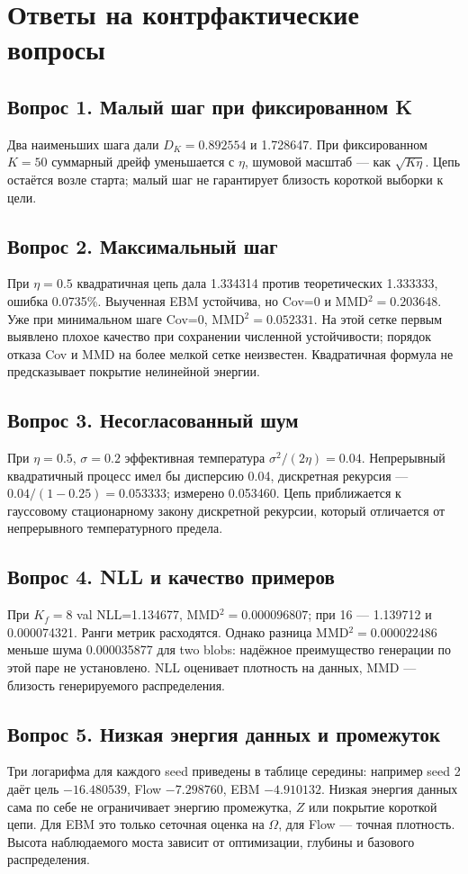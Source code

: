 \section{Ответы на контрфактические вопросы}
\subsection*{Вопрос 1. Малый шаг при фиксированном K}
Два наименьших шага дали $D_K=0.892554$ и 1.728647. При фиксированном $K=50$ суммарный дрейф уменьшается с $\eta$, шумовой масштаб --- как $\sqrt{K\eta}$. Цепь остаётся возле старта; малый шаг не гарантирует близость короткой выборки к цели.
\subsection*{Вопрос 2. Максимальный шаг}
При $\eta=0.5$ квадратичная цепь дала 1.334314 против теоретических 1.333333, ошибка 0.0735\%. Выученная EBM устойчива, но Cov=0 и MMD$^2=0.203648$. Уже при минимальном шаге Cov=0, MMD$^2=0.052331$. На этой сетке первым выявлено плохое качество при сохранении численной устойчивости; порядок отказа Cov и MMD на более мелкой сетке неизвестен. Квадратичная формула не предсказывает покрытие нелинейной энергии.
\subsection*{Вопрос 3. Несогласованный шум}
При $\eta=0.5$, $\sigma=0.2$ эффективная температура $\sigma^2/(2\eta)=0.04$. Непрерывный квадратичный процесс имел бы дисперсию 0.04, дискретная рекурсия --- $0.04/(1-0.25)=0.053333$; измерено 0.053460. Цепь приближается к гауссовому стационарному закону дискретной рекурсии, который отличается от непрерывного температурного предела.
\subsection*{Вопрос 4. NLL и качество примеров}
При $K_f=8$ val NLL=1.134677, MMD$^2=0.000096807$; при 16 --- 1.139712 и 0.000074321. Ранги метрик расходятся. Однако разница MMD$^2=0.000022486$ меньше шума 0.000035877 для two blobs: надёжное преимущество генерации по этой паре не установлено. NLL оценивает плотность на данных, MMD --- близость генерируемого распределения.
\subsection*{Вопрос 5. Низкая энергия данных и промежуток}
Три логарифма для каждого seed приведены в таблице середины: например seed 2 даёт цель $-16.480539$, Flow $-7.298760$, EBM $-4.910132$. Низкая энергия данных сама по себе не ограничивает энергию промежутка, $Z$ или покрытие короткой цепи. Для EBM это только сеточная оценка на $\Omega$, для Flow --- точная плотность. Высота наблюдаемого моста зависит от оптимизации, глубины и базового распределения.


